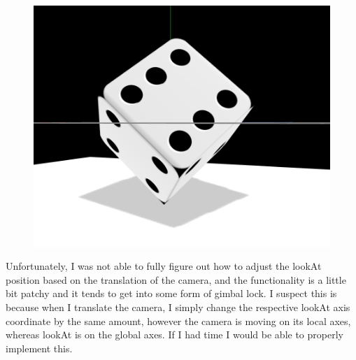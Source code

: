 \documentclass[12pt]{article}
\begin{document}
\begin{figure}[H]
\begin{minipage}{.33\textwidth}
    \includegraphics[width=.9\linewidth]{25.png}
    \label{fig:tes0t4}
  \end{minipage}
\end{figure}
Unfortunately, I was not able to fully figure out how to adjust the lookAt position based on the translation of the camera, and the functionality is a little bit patchy and it tends to get into some form of gimbal lock. I suspect this is because when I translate the camera, I simply change the respective lookAt axis coordinate by the same amount, however the camera is moving on its local axes, whereas lookAt is on the global axes.
If I had time I would be able to properly implement this.
\end{document}

